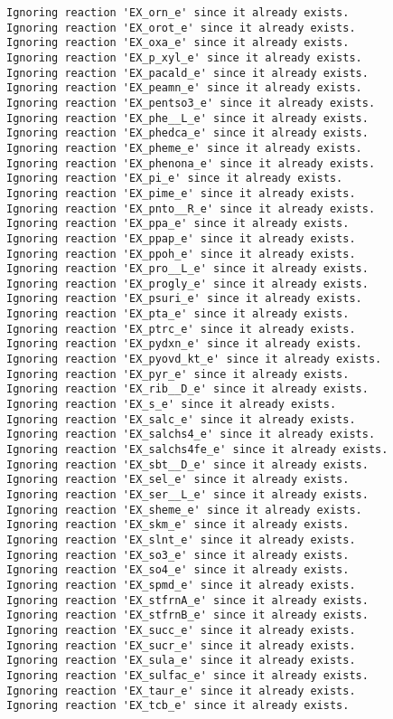 \documentclass[
  letterpaper,
  DIV=11,
  numbers=noendperiod]{scrartcl}
\begin{document}
\begin{verbatim}
Ignoring reaction 'EX_orn_e' since it already exists.
Ignoring reaction 'EX_orot_e' since it already exists.
Ignoring reaction 'EX_oxa_e' since it already exists.
Ignoring reaction 'EX_p_xyl_e' since it already exists.
Ignoring reaction 'EX_pacald_e' since it already exists.
Ignoring reaction 'EX_peamn_e' since it already exists.
Ignoring reaction 'EX_pentso3_e' since it already exists.
Ignoring reaction 'EX_phe__L_e' since it already exists.
Ignoring reaction 'EX_phedca_e' since it already exists.
Ignoring reaction 'EX_pheme_e' since it already exists.
Ignoring reaction 'EX_phenona_e' since it already exists.
Ignoring reaction 'EX_pi_e' since it already exists.
Ignoring reaction 'EX_pime_e' since it already exists.
Ignoring reaction 'EX_pnto__R_e' since it already exists.
Ignoring reaction 'EX_ppa_e' since it already exists.
Ignoring reaction 'EX_ppap_e' since it already exists.
Ignoring reaction 'EX_ppoh_e' since it already exists.
Ignoring reaction 'EX_pro__L_e' since it already exists.
Ignoring reaction 'EX_progly_e' since it already exists.
Ignoring reaction 'EX_psuri_e' since it already exists.
Ignoring reaction 'EX_pta_e' since it already exists.
Ignoring reaction 'EX_ptrc_e' since it already exists.
Ignoring reaction 'EX_pydxn_e' since it already exists.
Ignoring reaction 'EX_pyovd_kt_e' since it already exists.
Ignoring reaction 'EX_pyr_e' since it already exists.
Ignoring reaction 'EX_rib__D_e' since it already exists.
Ignoring reaction 'EX_s_e' since it already exists.
Ignoring reaction 'EX_salc_e' since it already exists.
Ignoring reaction 'EX_salchs4_e' since it already exists.
Ignoring reaction 'EX_salchs4fe_e' since it already exists.
Ignoring reaction 'EX_sbt__D_e' since it already exists.
Ignoring reaction 'EX_sel_e' since it already exists.
Ignoring reaction 'EX_ser__L_e' since it already exists.
Ignoring reaction 'EX_sheme_e' since it already exists.
Ignoring reaction 'EX_skm_e' since it already exists.
Ignoring reaction 'EX_slnt_e' since it already exists.
Ignoring reaction 'EX_so3_e' since it already exists.
Ignoring reaction 'EX_so4_e' since it already exists.
Ignoring reaction 'EX_spmd_e' since it already exists.
Ignoring reaction 'EX_stfrnA_e' since it already exists.
Ignoring reaction 'EX_stfrnB_e' since it already exists.
Ignoring reaction 'EX_succ_e' since it already exists.
Ignoring reaction 'EX_sucr_e' since it already exists.
Ignoring reaction 'EX_sula_e' since it already exists.
Ignoring reaction 'EX_sulfac_e' since it already exists.
Ignoring reaction 'EX_taur_e' since it already exists.
Ignoring reaction 'EX_tcb_e' since it already exists.

\end{verbatim}
\end{document}
